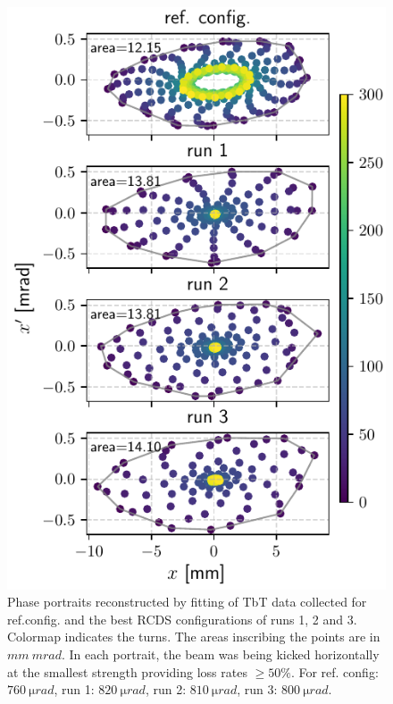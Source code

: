 \documentclass[a4paper,
               keeplastbox,   %
               ]{jacow}
\begin{document}
\begin{figure}[!h]
    \centering
    \includegraphics[width=\columnwidth]{old_tunes_phase_and_area.pdf}
    \caption{Phase portraits reconstructed by fitting of TbT data collected for ref.config. and the best RCDS configurations of runs 1, 2 and 3. Colormap indicates the turns. The areas inscribing the points are in $\unit{mm}~\unit{mrad}$. In each portrait, the beam was being kicked horizontally at the smallest strength providing loss rates $\geq 50\%$. For ref. config: $760~\unit{\micro rad}$, run 1: $820~\unit{\micro rad}$, run 2: $810~\unit{\micro rad}$, run 3: $800~\unit{\micro rad}$.} 
    \label{fig:oldtunes_phase}
\end{figure}
\end{document}
